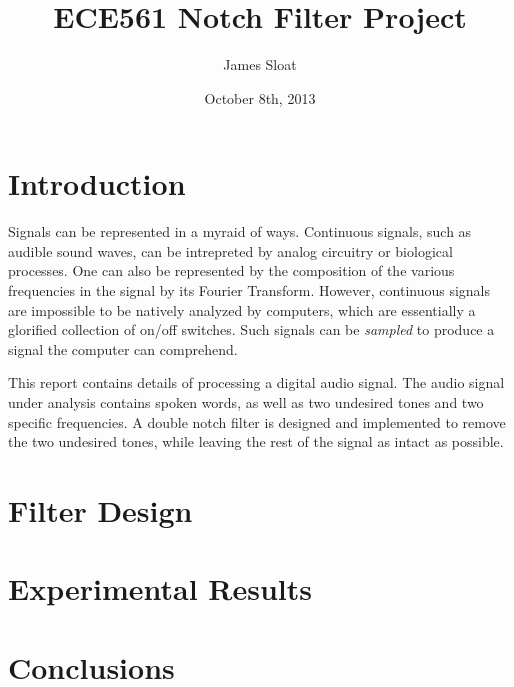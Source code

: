\documentclass[12pt, titlepage]{article}
\author{James Sloat}
\title{ECE561 Notch Filter Project}
\date{October 8th, 2013}
\begin{document}
\maketitle

\section{Introduction}

Signals can be represented in a myraid of ways. Continuous signals, such as audible sound waves, can be intrepreted by analog circuitry or biological processes. One can also be represented by the composition of the various frequencies in the signal by its Fourier Transform. However, continuous signals are impossible to be natively analyzed by computers, which are essentially a glorified collection of on/off switches. Such signals can be \textit{sampled} to produce a signal the computer can comprehend.

This report contains details of processing a digital audio signal. The audio signal under analysis contains spoken words, as well as two undesired tones and two specific frequencies. A double notch filter is designed and implemented to remove the two undesired tones, while leaving the rest of the signal as intact as possible.

\section{Filter Design}

\section{Experimental Results}

\section{Conclusions}
\end{document}
